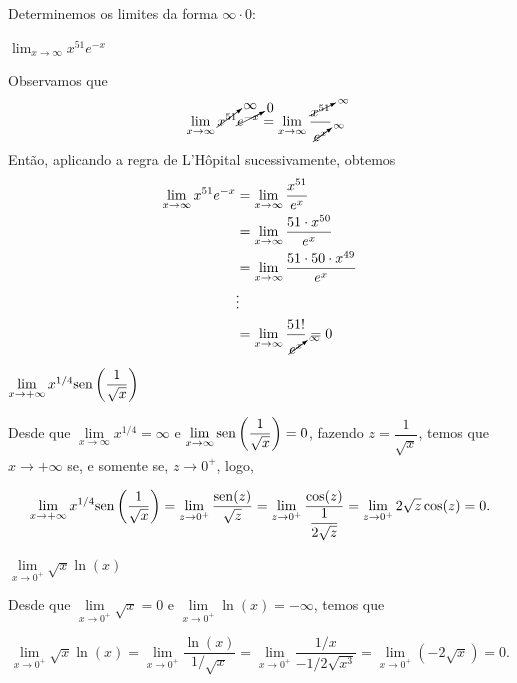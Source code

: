 \cleardoublepage\documentclass[../main.tex]{subfiles}
\begin{document}
\begin{exeresol}
Determinemos os limites da forma \(\infty\cdot0\):
\begin{compactenum}[a) ]
\item \(\lim_{x\to \infty} x^{51}e^{-x}\)

\begin{resol}
    Observamos que
  \begin{equation*}
    \lim_{x\to \infty} \cancelto{\infty}{x^{51}}\cancelto{0}{e^{-x}} = \lim_{x\to \infty} \frac{\cancelto{\infty}{x^{51}}}{\cancelto{\infty}{e^{x}}}
  \end{equation*}
  Então, aplicando a regra de L'Hôpital sucessivamente, obtemos
  \begin{align*}
    \lim_{x\to\infty} x^{51}e^{-x} &= \lim_{x\to\infty} \frac{x^{51}}{e^x} \\
                                   &= \lim_{x\to\infty} \frac{51\cdot x^{50}}{e^x} \\
                                   &= \lim_{x\to\infty} \frac{51\cdot 50\cdot x^{49}}{e^x} \\
                                   &\vdots \\
                                   &= \lim_{x\to\infty} \frac{51!}{\cancelto{\infty}{e^x}} = 0
  \end{align*}
 \end{resol}
\item \(\lim \limits_{x\to +\infty}x^{1/4}{\rm sen}\left(\dfrac{1}{\sqrt{x}}\right)\)

\begin{resol}
Desde que \(\lim \limits_{x\to \infty}x^{1/4}=\infty\) e \(\lim \limits_{x\to \infty}{\rm sen}\left(\dfrac{1}{\sqrt{x}}\right)=0\), fazendo \(z=\dfrac{1}{\sqrt{x}}\), temos que \(x\to +\infty\) se, e somente se, \(z\to 0^+\), logo,

\[ \lim \limits_{x\to +\infty}x^{1/4}{\rm sen}\left(\dfrac{1}{\sqrt{x}}\right)=\lim \limits_{z\to 0^+}\dfrac{{\rm sen}(z)}{\sqrt{z}}=\lim \limits_{z\to 0^+}\dfrac{\cos(z)}{\dfrac{1}{2\sqrt{z}}}=\lim \limits_{z\to 0^+}2\sqrt{z}\cos(z)=0. \]
\end{resol}
\item \(\lim \limits_{x\to 0^+}\sqrt{x}\ln(x)\)\\

\begin{resol}
Desde que \(\lim \limits_{x\to0^+}\sqrt{x}=0\) e \(\lim \limits_{x\to 0^+}\ln(x)=-\infty\), temos que

\[ \lim \limits_{x\to 0^+}\sqrt{x}\ln(x)=\lim \limits_{x\to 0^+}\dfrac{\ln(x)}{1/\sqrt{x}}=\lim \limits_{x \to 0^+}\dfrac{1/x}{-1/2\sqrt{x^3} }=\lim \limits_{x \to 0^+}(-2\sqrt{x})=0. \]
\end{resol}
\end{compactenum}
    \end{exeresol}
\end{document}
